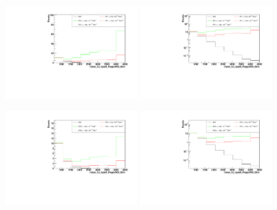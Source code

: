 \begin{figure}[h]
  \begin{center}
	\includegraphics[width=0.45\textwidth]{Plots/aQGC_kinematics/mass_lvj_type0_PuppiAK8_8bin_FT1.pdf}%
	\includegraphics[width=0.45\textwidth]{Plots/aQGC_kinematics/mass_lvj_type0_PuppiAK8_8bin_FT1_log.pdf}\\	
    \caption{}
  \end{center}
\end{figure}
\begin{figure}[h]
  \begin{center}
	\includegraphics[width=0.45\textwidth]{Plots/aQGC_kinematics/mass_lvj_type0_PuppiAK8_8bin_FT2.pdf}%
	\includegraphics[width=0.45\textwidth]{Plots/aQGC_kinematics/mass_lvj_type0_PuppiAK8_8bin_FT2_log.pdf}\\	
    \caption{}
  \end{center}
\end{figure}
